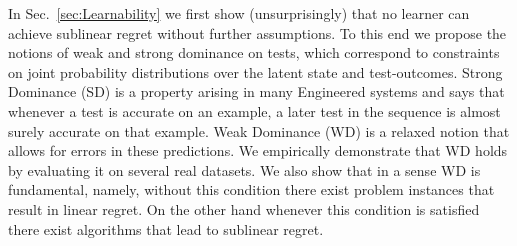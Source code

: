 

In Sec.~\ref{sec:Learnability} we first show (unsurprisingly) that no learner can achieve sublinear regret without further assumptions. To this end we propose the notions of weak and strong dominance on tests, which correspond to constraints on joint probability distributions over the latent state and test-outcomes. Strong Dominance (SD) is a property arising in many Engineered systems and says that whenever a test is accurate on an example, a later test in the sequence is almost surely accurate on that example. %
Weak Dominance (WD) is a relaxed notion that allows for errors in these predictions. We empirically demonstrate that WD holds by evaluating it on several real datasets. We also show that in a sense WD is fundamental, namely, without this condition there exist problem instances that result in linear regret. On the other hand whenever this condition is satisfied there exist algorithms that lead to sublinear regret. 

